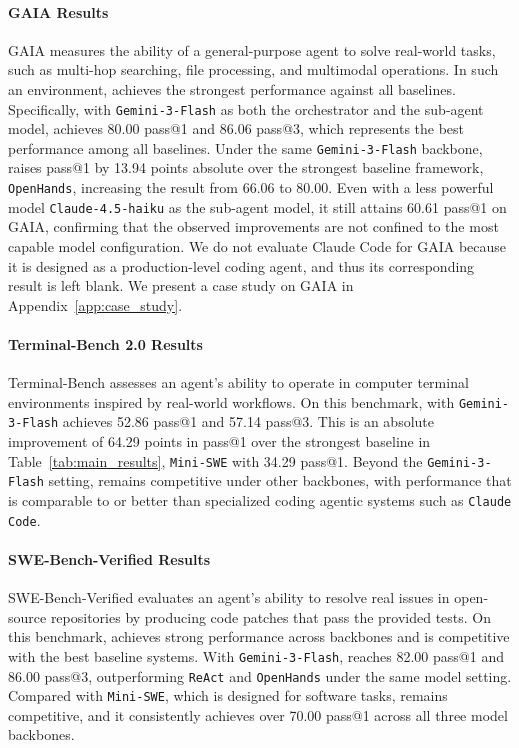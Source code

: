 \paragraph{GAIA Results}
GAIA measures the ability of a general-purpose agent to solve real-world tasks, such as multi-hop searching, file processing, and multimodal operations. In such an environment, \our achieves the strongest performance against all baselines.
Specifically, with \texttt{Gemini-3-Flash} as both the orchestrator and the sub‑agent model, \our achieves 80.00 pass@1 and 86.06 pass@3, which represents the best performance among all baselines. Under the same \texttt{Gemini-3-Flash} backbone, \our raises pass@1 by 13.94 points absolute over the strongest baseline framework, \texttt{OpenHands}, increasing the result from 66.06 to 80.00. Even with a less powerful model \texttt{Claude‑4.5‑haiku} as the sub-agent model, it still attains 60.61 pass@1 on GAIA, confirming that the observed improvements are not confined to the most capable model configuration. We do not evaluate Claude Code for GAIA because it is designed as a production-level coding agent, and thus its corresponding result is left blank. We present a case study on GAIA in Appendix~\ref{app:case_study}.

\paragraph{Terminal-Bench 2.0 Results}
Terminal-Bench assesses an agent’s ability to operate in computer terminal environments inspired by real-world workflows. 
On this benchmark, \our with \texttt{Gemini-3-Flash} achieves 52.86 pass@1 and 57.14 pass@3. This is an absolute improvement of 64.29 points in pass@1 over the strongest baseline in Table~\ref{tab:main_results}, \texttt{Mini-SWE} with 34.29 pass@1.
Beyond the \texttt{Gemini-3-Flash} setting, \our remains competitive under other backbones, with performance that is comparable to or better than specialized coding agentic systems such as \texttt{Claude Code}.

\paragraph{SWE-Bench-Verified Results}
SWE-Bench-Verified evaluates an agent’s ability to resolve real issues in open-source repositories by producing code patches that pass the provided tests.
On this benchmark, \our achieves strong performance across backbones and is competitive with the best baseline systems. With \texttt{Gemini-3-Flash}, \our reaches 82.00 pass@1 and 86.00 pass@3, outperforming \texttt{ReAct} and \texttt{OpenHands} under the same model setting. Compared with \texttt{Mini-SWE}, which is designed for software tasks, \our remains competitive, and it consistently achieves over 70.00 pass@1 across all three model backbones.

